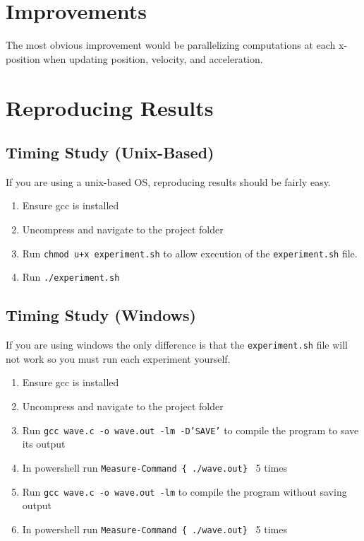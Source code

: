 \documentclass[9pt,technote]{IEEEtran}
\begin{document}
\section{Improvements}

The most obvious improvement would be parallelizing computations at each x-position when updating position, velocity, and acceleration.

\pagebreak

\section{Reproducing Results}

\subsection{Timing Study (Unix-Based)}

If you are using a unix-based OS, reproducing results should be fairly easy.

\begin{enumerate}
    \item Ensure gcc is installed
    \item Uncompress and navigate to the project folder
    \item Run \texttt{chmod u+x experiment.sh} to allow execution of the \texttt{experiment.sh} file.
    \item Run \texttt{./experiment.sh}
\end{enumerate}

\subsection{Timing Study (Windows)}

If you are using windows the only difference is that the \texttt{experiment.sh} file will not work so you must run each experiment yourself.

\begin{enumerate}
    \item Ensure gcc is installed
    \item Uncompress and navigate to the project folder
    \item Run \texttt{gcc wave.c -o wave.out -lm -D'SAVE'} to compile the program to save its output
    \item In powershell run \texttt{Measure-Command \{ ./wave.out\} }  5 times
    \item Run \texttt{gcc wave.c -o wave.out -lm} to compile the program without saving output
    \item In powershell run \texttt{Measure-Command \{ ./wave.out\} } 5 times
\end{enumerate}
\end{document}
